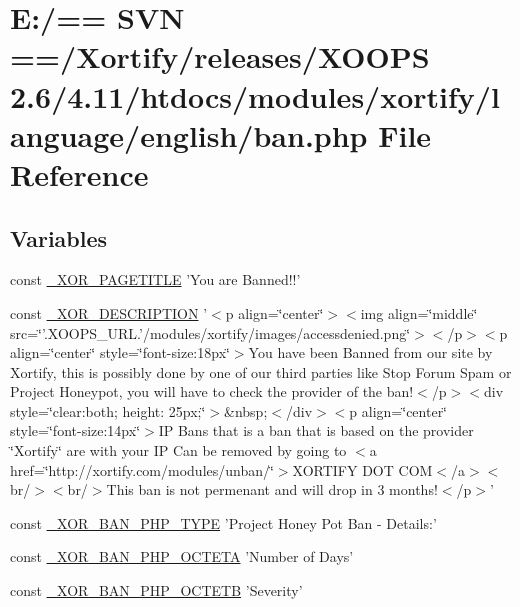 \hypertarget{ban_8php}{\section{E\-:/== S\-V\-N ==/\-Xortify/releases/\-X\-O\-O\-P\-S 2.6/4.11/htdocs/modules/xortify/language/english/ban.php File Reference}
\label{ban_8php}
}
\subsection*{Variables}
\begin{DoxyCompactItemize}
\item 
const \hyperlink{ban_8php_aa879fc3c50b0de0ec937a511dc798057}{\-\_\-\-X\-O\-R\-\_\-\-P\-A\-G\-E\-T\-I\-T\-L\-E} 'You are Banned!!'
\item 
const \hyperlink{ban_8php_aff93f77f179e77eefb0099807ed2605a}{\-\_\-\-X\-O\-R\-\_\-\-D\-E\-S\-C\-R\-I\-P\-T\-I\-O\-N} '$<$p align=\char`\"{}center\char`\"{}$>$$<$img align=\char`\"{}middle\char`\"{} src=\char`\"{}'.X\-O\-O\-P\-S\-\_\-\-U\-R\-L.'/modules/xortify/images/accessdenied.\-png\char`\"{}$>$$<$/p$>$$<$p align=\char`\"{}center\char`\"{} style=\char`\"{}font-\/size\-:18px\char`\"{}$>$You have been Banned from our site by Xortify, this is possibly done by one of our third parties like Stop Forum Spam or Project Honeypot, you will have to check the provider of the ban!$<$/p$>$$<$div style=\char`\"{}clear\-:both; height\-: 25px;\char`\"{}$>$\&nbsp;$<$/div$>$$<$p align=\char`\"{}center\char`\"{} style=\char`\"{}font-\/size\-:14px\char`\"{}$>$\-I\-P Bans that is a ban that is based on the provider \char`\"{}\-Xortify\char`\"{} are with your I\-P Can be removed by going to $<$a href=\char`\"{}http\-://xortify.\-com/modules/unban/\char`\"{}$>$\-X\-O\-R\-T\-I\-F\-Y D\-O\-T C\-O\-M$<$/a$>$$<$br/$>$$<$br/$>$\-This ban is not permenant and will drop in 3 months!$<$/p$>$'
\item 
const \hyperlink{ban_8php_a04a63bef6c79e037e83950390ff8cf5a}{\-\_\-\-X\-O\-R\-\_\-\-B\-A\-N\-\_\-\-P\-H\-P\-\_\-\-T\-Y\-P\-E} 'Project Honey Pot Ban -\/ Details\-:'
\item 
const \hyperlink{ban_8php_a6127ff3e04b1a2c621962aeef2aa26e9}{\-\_\-\-X\-O\-R\-\_\-\-B\-A\-N\-\_\-\-P\-H\-P\-\_\-\-O\-C\-T\-E\-T\-A} 'Number of Days'
\item 
const \hyperlink{ban_8php_a1018fe45867767415d72eba181c4c456}{\-\_\-\-X\-O\-R\-\_\-\-B\-A\-N\-\_\-\-P\-H\-P\-\_\-\-O\-C\-T\-E\-T\-B} 'Severity'
$$
\end{DoxyCompactItemize}
